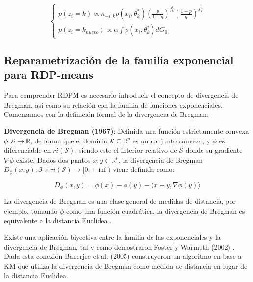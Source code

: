 \begin{equation}
\begin{cases}
p(z_i = k) \varpropto n_{-i,k}p(x_i,\theta_k^*)\left(\frac{p}{1-q}\right)^{f_{k}^i} \left(\frac{1-p}{q}\right)^{s_{k}^i} \\
p(z_i = k_{nuevo}) \varpropto \alpha \int p(x_i,\theta_k^*)dG_0
\end{cases}
\label{eqn53}
\end{equation}

\subsection{Reparametrización de la familia exponencial para RDP-means}

Para comprender \acf{RDPM} es necesario introducir el concepto de divergencia de Bregman, así como su relación con la familia de funciones exponenciales. Comenzamos con la definición formal de la divergencia de Bregman:

\begin{definicion}
	
	\textbf{Divergencia de Bregman (1967)}: Definida una función estrictamente convexa $\phi: \mathcal{S} \rightarrow \mathbb{R}$, de forma que el dominio $\mathcal{S} \subseteq \mathbb{R}^p$ es un conjunto convexo, y $\phi$ es diferenciable en $ri(\mathcal{S})$, siendo este el interior relativo de $\mathcal{S}$ donde su gradiente $\nabla \phi$ existe. Dados dos puntos $x,y \in \mathbb{R}^p$, la divergencia de Bregman $D_{\phi}(x,y): \mathcal{S} \times ri(\mathcal{S}) \rightarrow [0, + \inf)$ viene definida como: \cite{RDPM:2015}
	
	$$ D_{\phi}(x,y) = \phi(x) - \phi(y) - \langle x - y, \nabla \phi(y)  \rangle $$
	
\end{definicion}

La divergencia de Bregman es una clase general de medidas de distancia, por ejemplo, tomando $\phi$ como una función cuadrática, la divergencia de Bregman es equivalente a la distancia Euclidea \cite{Banerjee:2005}.

Existe una aplicación biyectiva entre la familia de las exponenciales y la divergencia de Bregman, tal y como demostraron Foster y Warmuth (2002) \cite{Forster:2002}. Dada esta conexión Banerjee et al. (2005) \cite{Banerjee:2005} construyeron un algoritmo en base a \acf{KM} que utiliza la divergencia de Bregman como medida de distancia en lugar de la distancia Euclidea.

